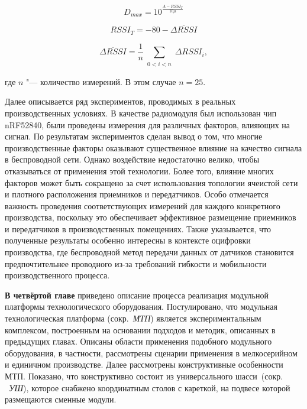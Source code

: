 \begin{equation}
D_{max} = 10^\frac{A-RSSI_T}{10 \mu}
\label{eq-5}
\end{equation}

\begin{equation}
RSSI_T = -80-\overline{{\mathit \Delta} RSSI}
\label{eq-6}
\end{equation}

\begin{equation}
\overline{{\mathit \Delta} RSSI} = \frac1n \sum_{\substack{0 < i < n}}{\mathit\Delta} RSSI_i,
\label{eq-7}
\end{equation}

\noindent где $n$ "--- количество измерений. В этом случае $n = 25$.  

Далее описывается ряд экспериментов, проводимых в реальных производственных условиях. В качестве радиомодуля был использован чип nRF52840, были проведены измерения для различных факторов, влияющих на сигнал. По результатам экспериментов сделан вывод о том, что многие производственные факторы оказывают существенное влияние на качество сигнала в беспроводной сети. Однако воздействие недостаточно велико, чтобы отказываться от применения этой технологии. Более того, влияние многих факторов может быть сокращено за счет использования топологии ячеистой сети и плотного расположения приемников и передатчиков. Особо отмечается важность проведения соответствующих измерений для каждого конкретного производства, поскольку это обеспечивает эффективное размещение приемников и передатчиков в производственных помещениях. Также указывается, что полученные результаты особенно интересны в контексте оцифровки производства, где беспроводной метод передачи данных от датчиков становится предпочтительнее проводного из-за требований гибкости и мобильности производственного процесса. 


\textbf{В четвёртой главе} приведено описание процесса реализация модульной платформы технологического оборудования. Постулировано, что модульная технологическая платформа (сокр.~\textit{МТП}) является экспериментальным комплексом, построенным на основании подходов и методик, описанных в предыдущих главах. Описаны области применения подобного модульного оборудования, в частности, рассмотрены сценарии применения в мелкосерийном и единичном производстве. Далее рассмотрены конструктивные особенности МТП. Показано, что конструктивно состоит из универсального шасси~(сокр. ~\textit{УШ}), которое снабжено координатным столов с кареткой, на подвесе которой размещаются сменные модули. 

